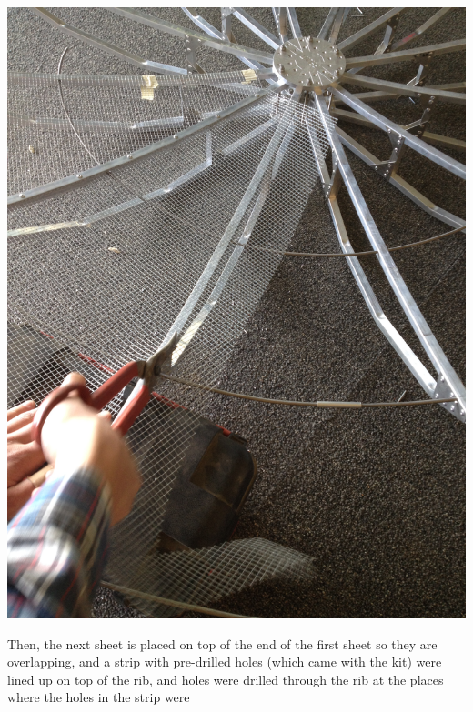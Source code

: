 \documentclass[11pt]{article} %
\begin{document}
\begin{center}
\includegraphics[scale=0.12]{dish/13.jpeg}
\end{center}

Then, the next sheet is placed on top of the end of the first sheet so they are overlapping, and a strip with pre-drilled holes (which came with the kit) were lined up on top of the rib, and holes were drilled through the rib at the places where the holes in the strip were
\end{document}
